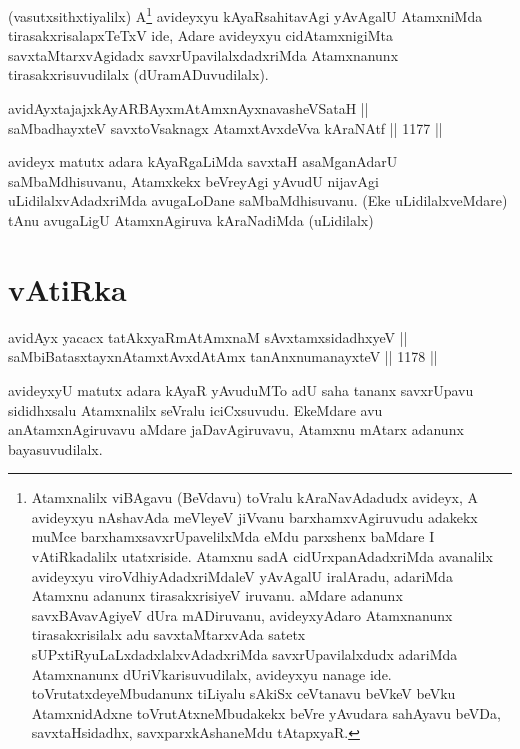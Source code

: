 \begin{artha}
(vasutxsithxtiyalilx) A\footnote{Atamxnalilx viBAgavu (BeVdavu) toVralu kAraNavAdadudx avideyx, A avideyxyu nAshavAda meVleyeV jiVvanu barxhamxvAgiruvudu adakekx muMce barxhamxsavxrUpavelilxMda eMdu parxshenx baMdare I vAtiRkadalilx utatxriside. Atamxnu sadA cidUrxpanAdadxriMda avanalilx avideyxyu viroVdhiyAdadxriMdaleV yAvAgalU iralAradu, adariMda Atamxnu adanunx tirasakxrisiyeV iruvanu. aMdare adanunx savxBAvavAgiyeV dUra mADiruvanu, avideyxyAdaro Atamxnanunx tirasakxrisilalx adu savxtaMtarxvAda satetx sUPxtiRyuLaLxdadxlalxvAdadxriMda savxrUpavilalxdudx adariMda Atamxnanunx dUriVkarisuvudilalx, avideyxyu nanage ide. toVrutatxdeyeMbudanunx tiLiyalu sAkiSx ceVtanavu beVkeV beVku AtamxnidAdxne toVrutAtxneMbudakekx beVre yAvudara sahAyavu beVDa, savxtaHsidadhx, savxparxkAshaneMdu tAtapxyaR.} avideyxyu kAyaRsahitavAgi yAvAgalU AtamxniMda tirasakxrisalapxTeTxV ide, Adare avideyxyu cidAtamxnigiMta savxtaMtarxvAgidadx savxrUpavilalxdadxriMda Atamxnanunx tirasakxrisuvudilalx (dUramADuvudilalx).
\end{artha}


\begin{shl}
avidAyxtajajxkAyARBAyxmAtAmx\s nAyxnavasheVSataH || \\
saMbadhayxteV savxtoV\s saknagx AtamxtAvxdeVva kAraNAtf ||  1177 ||  
\end{shl}

\begin{artha}
avideyx matutx adara kAyaRgaLiMda savxtaH asaMganAdarU saMbaMdhisuvanu, Atamxkekx beVreyAgi yAvudU nijavAgi uLidilalxvAdadxriMda avugaLoDane saMbaMdhisuvanu. (Eke uLidilalxveMdare) tAnu avugaLigU AtamxnAgiruva kAraNadiMda (uLidilalx)
\end{artha}

\section*{vAtiRka}

\begin{shl}
avidAyx yacacx tatAkxyaRmAtAmxnaM sAvxtamxsidadhxyeV ||  \\
saMbiBatasxtayxnAtamxtAvxdAtAmx tanAnxnumanayxteV ||  1178 ||  
\end{shl}

\begin{artha}
avideyxyU matutx adara kAyaR yAvuduMTo adU saha tananx savxrUpavu sididhxsalu Atamxnalilx seVralu iciCxsuvudu. EkeMdare avu anAtamxnAgiruvavu aMdare jaDavAgiruvavu, Atamxnu mAtarx adanunx bayasuvudilalx.
\end{artha}

